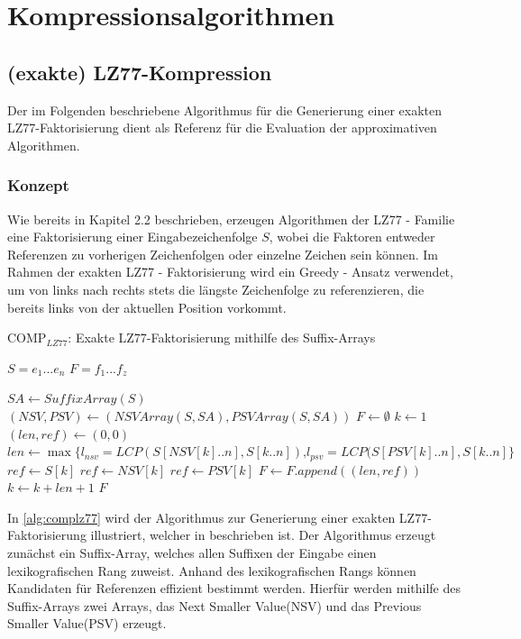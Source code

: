 \chapter{Kompressionsalgorithmen}

\section{(exakte) LZ77-Kompression}
Der im Folgenden beschriebene Algorithmus für die Generierung einer exakten LZ77-Faktorisierung dient als Referenz für die Evaluation der approximativen Algorithmen.

\subsection{Konzept}
Wie bereits in Kapitel 2.2 beschrieben, erzeugen Algorithmen der LZ77 - Familie eine Faktorisierung einer Eingabezeichenfolge $S$, wobei die Faktoren entweder Referenzen
zu vorherigen Zeichenfolgen oder einzelne Zeichen sein können. Im Rahmen der exakten LZ77 - Faktorisierung wird ein Greedy - Ansatz verwendet, um von links nach rechts 
stets die längste Zeichenfolge zu referenzieren, die bereits links von der aktuellen Position vorkommt.
\begin{algorithm}[ht]
\centering
\caption{COMP$_{LZ77}$: Exakte LZ77-Faktorisierung mithilfe des Suffix-Arrays} \label{alg:complz77}
\algorithmicrequire $S=e_1...e_n$
\algorithmicensure $F=f_1...f_z$
\begin{algorithmic} [1]
    \STATE $SA \gets SuffixArray(S)$
    \STATE $(NSV, PSV) \gets (NSVArray(S, SA), PSVArray(S, SA))$
    \STATE $F \gets \emptyset$
    \STATE $k \gets 1$
    \STATE $(len, ref) \gets (0, 0)$
    \STATE $len \gets \max\{l_{nsv}=LCP(S[NSV[k]..n], S[k..n])\text{,} l_{psv}=LCP(S[PSV[k]..n], S[k..n]\}$
        \STATE $ref \gets S[k]$
        \STATE $ref \gets NSV[k]$
    \ELSE
        \STATE $ref \gets PSV[k]$
    \ENDIF
    \STATE $F \gets F.append((len, ref))$
    \STATE $k \gets k + len + 1$
    \ENDWHILE
    \RETURN $F$
\end{algorithmic}
\end{algorithm}
In \ref{alg:complz77} wird der Algorithmus zur Generierung einer exakten LZ77-Faktorisierung illustriert, welcher in \cite{exactLemZiv} beschrieben ist. Der 
Algorithmus erzeugt zunächst ein Suffix-Array, welches allen Suffixen der Eingabe einen lexikografischen Rang zuweist. Anhand des lexikografischen Rangs 
können Kandidaten für Referenzen effizient bestimmt werden. Hierfür werden mithilfe des Suffix-Arrays zwei Arrays, das Next Smaller Value(NSV) und das 
Previous Smaller Value(PSV) erzeugt.

